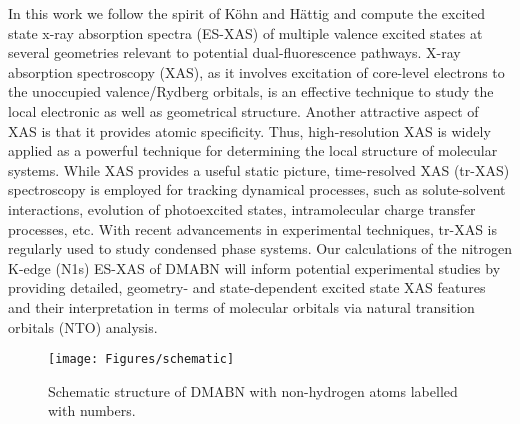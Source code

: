 \documentclass[journal=jacsat,manuscript=article]{achemso}
\begin{document}
In this work we follow the spirit of K{\"o}hn and H{\"a}ttig and compute the excited state x-ray absorption spectra (ES-XAS) of multiple valence excited states at several geometries relevant to potential dual-fluorescence pathways.
X-ray absorption spectroscopy (XAS), as it involves excitation of core-level electrons to the unoccupied valence/Rydberg orbitals, is an effective technique to study the local electronic as well as geometrical structure. Another attractive aspect of XAS is that it provides atomic specificity. Thus, high-resolution XAS is widely applied as a powerful technique for determining the local structure of molecular systems.\cite{van2016x,bunker2010introduction,Stohr1992,mcneilXrayFreeelectronLasers2010,garg1994x} While XAS provides a useful static picture, time-resolved XAS (tr-XAS) spectroscopy is employed for tracking dynamical processes, such as solute-solvent interactions, evolution of photoexcited states, intramolecular charge transfer processes, etc. With recent advancements in experimental techniques, tr-XAS is regularly used to study condensed phase systems.\cite{balerna2015synchrotron,bressler2010molecular,costantini2019picosecond} Our calculations of the nitrogen K-edge (N1s) ES-XAS of DMABN will inform potential experimental studies by providing detailed, geometry- and state-dependent excited state XAS features and their interpretation in terms of molecular orbitals via natural transition orbitals (NTO) analysis.
\begin{comment}
This pump-probe spectroscopy has also been employed to study gas-phase photochemical reactions.\cite{bhattacherjee2018ultrafast} In recent years, computational methods are also used to simulate the ES-XAS signals, which includes ring-opening reaction in cyclo-hexadiene,\cite{ring-opening-ES-xas} population transfer from photoexcited state of pyrazine, \cite{tsuru2019time} as well as for studying the photodissociation of ICN.\cite{morzan2020vibronic} In this work, we have explored the excited state PES of LE and ICT states of DMABN using the couple-cluster and density functional theory (DFT) methods. We have calculated the excited state XAS (ES-XAS) spectra for the geometries obtained from ground and excited state optimizations. Further, the trends in ES-XAS spectra depending on the structure of optimized geometry and the valence-excited state is discussed. 
\end{comment}

\begin{figure}
\texttt{[image: Figures/schematic]}\caption{Schematic structure of DMABN with non-hydrogen atoms labelled with numbers. \label{fig:schematic}}
\end{figure}
\end{document}
